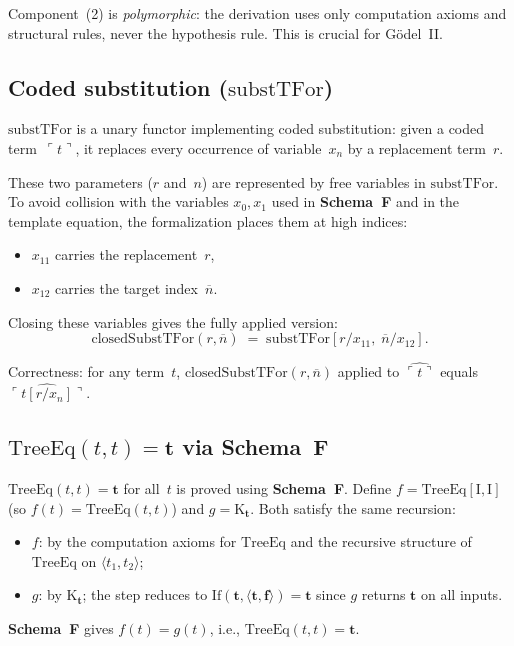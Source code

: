 \documentclass[11pt]{article}
\newcommand{\pair}[2]{\langle #1, #2 \rangle}
\newcommand{\trueT}{\mathbf{t}}
\newcommand{\falseT}{\mathbf{f}}
\newcommand{\SchemaF}{\textbf{Schema~F}}
\newcommand{\nat}[1]{\overline{#1}}
\newcommand{\code}[1]{\ulcorner #1 \urcorner}
\newcommand{\reify}[1]{\widehat{#1}}
\newcommand{\TreeEq}{\mathrm{TreeEq}}
\begin{document}
Component~(2) is \emph{polymorphic}: the derivation uses only
computation axioms and structural rules, never the hypothesis
rule.  This is crucial for G\"odel~II.

\subsection{Coded substitution ($\mathrm{substTFor}$)}

$\mathrm{substTFor}$ is a unary functor implementing coded
substitution: given a coded term~$\code{t}$,
it replaces every occurrence of variable~$x_n$ by a
replacement term~$r$.

These two parameters ($r$ and~$n$) are represented by free variables
in $\mathrm{substTFor}$.  To avoid collision with the variables
$x_0, x_1$ used in \SchemaF{} and in the template equation,
the formalization places them at high indices:
\begin{itemize}
\item $x_{11}$ carries the replacement~$r$,
\item $x_{12}$ carries the target index~$\nat{n}$.
\end{itemize}

Closing these variables gives the fully applied version:
\[
  \mathrm{closedSubstTFor}(r, \nat{n}) \;=\;
  \mathrm{substTFor}[r/x_{11},\; \nat{n}/x_{12}].
\]

Correctness: for any term~$t$,
$\mathrm{closedSubstTFor}(r, \nat{n})$ applied to
$\reify{\code{t}}$
equals $\reify{\code{t[r/x_n]}}$.

\subsection{$\TreeEq(t, t) = \trueT$ via \SchemaF}

$\TreeEq(t, t) = \trueT$ for all~$t$ is proved using \SchemaF.
Define $f = \TreeEq[\mathrm{I}, \mathrm{I}]$
(so $f(t) = \TreeEq(t,t)$) and $g = \mathrm{K}_\trueT$.
Both satisfy the same recursion:
\begin{itemize}
\item $f$: by the computation axioms for $\TreeEq$ and the
  recursive structure of $\TreeEq$ on $\pair{t_1}{t_2}$;
\item $g$: by $\mathrm{K}_\trueT$; the step reduces to
  $\mathrm{If}(\trueT, \pair{\trueT}{\falseT}) = \trueT$ since $g$
  returns $\trueT$ on all inputs.
\end{itemize}
\SchemaF{} gives $f(t) = g(t)$, i.e., $\TreeEq(t,t) = \trueT$.
\end{document}
